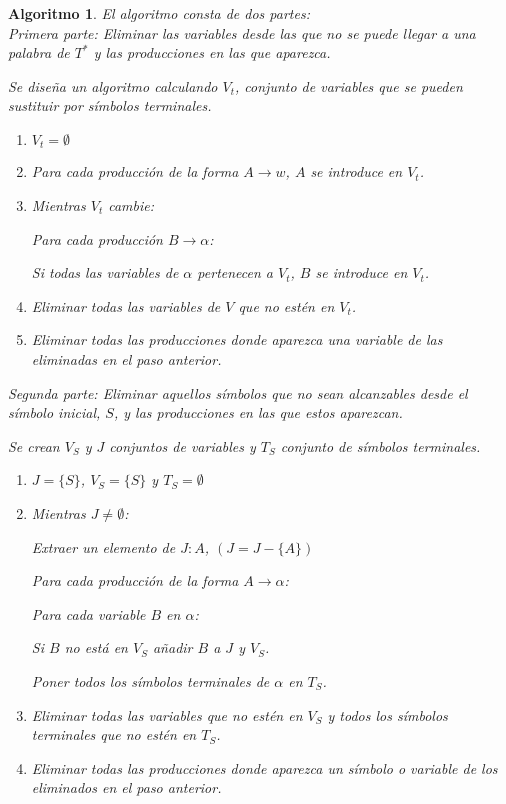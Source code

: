 \documentclass[11pt,titlepage,a4paper]{article}
\theoremstyle{ejemplo}
\theoremstyle{algoritmo}
\newtheorem*{alg}{Algoritmo} %
\begin{document}
\begin{alg}
El algoritmo consta de dos partes:
\\

\textit{Primera parte}: Eliminar las variables desde las que no se puede llegar a una palabra de $T^*$ y las producciones en las que aparezca.

Se diseña un algoritmo calculando $V_t$, conjunto de variables que se pueden
sustituir por símbolos terminales.
\begin{enumerate}[noitemsep]
	\item $V_t=\emptyset$
	\item Para cada producción de la forma $A\to w$, $A$ se introduce en $V_t$.
	\item Mientras $V_t$ cambie:
	
	\quad\quad Para cada producción $B\to\alpha$:
	
	\quad\quad\quad\quad Si todas las variables de $\alpha$ pertenecen a $V_t$,
	$B$ se introduce en $V_t$.
	\item Eliminar todas las variables de $V$ que no estén en $V_t$.
	\item Eliminar todas las producciones donde aparezca una variable de las
	eliminadas en el paso anterior.
\end{enumerate}

\textit{Segunda parte}: Eliminar aquellos símbolos que no sean alcanzables 
desde el símbolo inicial, $S$, y las producciones en las que estos aparezcan.

Se crean $V_S$ y $J$ conjuntos de variables y $T_S$ conjunto de símbolos
terminales.
\begin{enumerate}[noitemsep]
	\item $J=\{S\}$, $V_S=\{S\}$ y $T_S=\emptyset$
	\item Mientras $J\neq\emptyset$:
	
	\quad\quad Extraer un elemento de $J:A$, $(J=J-\{A\})$
	
	\quad\quad Para cada producción de la forma $A\to\alpha$:
	
	\quad\quad\quad\quad Para cada variable $B$ en $\alpha$:
	
	\quad\quad\quad\quad\quad\quad Si $B$ no está en $V_S$ añadir $B$ a $J$
	y $V_S$.
	
	\quad\quad\quad\quad Poner todos los símbolos terminales de $\alpha$ en
	$T_S$.
	\item Eliminar todas las variables que no estén en $V_S$ y todos los 
	símbolos terminales que no estén en $T_S$.
	\item Eliminar todas las producciones donde aparezca un símbolo o variable
	de los eliminados en el paso anterior.
\end{enumerate}
\end{alg}
\end{document}
